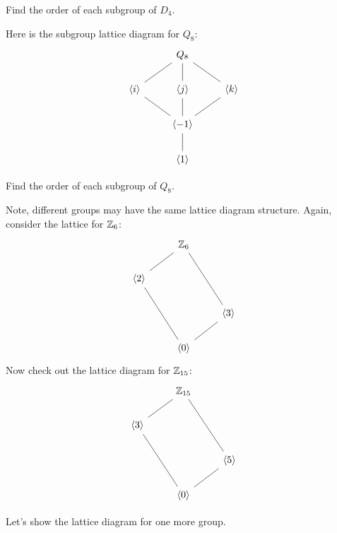 \documentclass{ximera}
\begin{document}
\begin{exercise}
  Find the order of each subgroup of $D_4$.
\end{exercise}



\begin{example}
  Here is the subgroup lattice diagram for $Q_8$:
  \[
  \begin{tikzcd}
    & Q_8 \ar[rd,-] \ar[d,-] \ar[ld,-] &       \\
    \<i\>  \ar[rd,-] & \<j\>  \ar[d,-]     & \<k\> \ar[ld,-]\\
    &\< -1\> \ar[d,-]&        \\   
    & \<1\> &
  \end{tikzcd}
  \]
\end{example}


\begin{exercise}
  Find the order of each subgroup of $Q_8$.
\end{exercise}



\begin{example}
  Note, different groups may have the same lattice diagram structure.
  Again, consider the lattice for $\mathbb Z_6$:
  \[
  \begin{tikzcd}
    & \Z_6 \ar[ld,-]  \ar[rdd,-] &       \\
    \<2\> \ar[rdd,-] &  &\\
   & &  \< 3\> \ar[ld,-]        \\   
    & \<0\> &
  \end{tikzcd}
  \] 
  Now check out the lattice diagram for $\mathbb Z_{15}$:
  \[
  \begin{tikzcd}
        & \Z_{15} \ar[ld,-]  \ar[rdd,-] &       \\
    \<3\> \ar[rdd,-] &  &\\
   & &  \< 5\> \ar[ld,-]        \\   
    & \<0\> &
      \end{tikzcd}
  \]
\end{example}






Let's show the lattice diagram for one more group.
\end{document}
